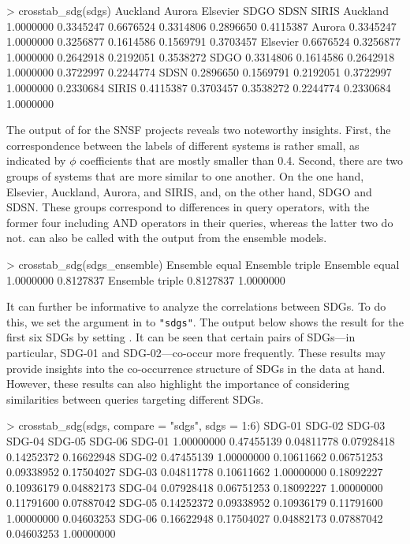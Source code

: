 \begin{example}

> crosstab_sdg(sdgs)
          Auckland    Aurora  Elsevier      SDGO      SDSN     SIRIS
Auckland 1.0000000 0.3345247 0.6676524 0.3314806 0.2896650 0.4115387
Aurora   0.3345247 1.0000000 0.3256877 0.1614586 0.1569791 0.3703457
Elsevier 0.6676524 0.3256877 1.0000000 0.2642918 0.2192051 0.3538272
SDGO     0.3314806 0.1614586 0.2642918 1.0000000 0.3722997 0.2244774
SDSN     0.2896650 0.1569791 0.2192051 0.3722997 1.0000000 0.2330684
SIRIS    0.4115387 0.3703457 0.3538272 0.2244774 0.2330684 1.0000000

\end{example}

The output of  for the SNSF projects reveals two noteworthy insights. First, the correspondence between the labels of different systems is rather small, as indicated by $\phi$ coefficients that are mostly smaller than 0.4. Second, there are two groups of systems that are more similar to one another. On the one hand, Elsevier, Auckland, Aurora, and SIRIS, and, on the other hand, SDGO and SDSN. These groups correspond to differences in query operators, with the former four including AND operators in their queries, whereas the latter two do not.  can also be called with the output from the ensemble models.

\begin{example}
> crosstab_sdg(sdgs_ensemble)
                Ensemble equal Ensemble triple
Ensemble equal       1.0000000       0.8127837
Ensemble triple      0.8127837       1.0000000
\end{example}


It can further be informative to analyze the correlations between SDGs. To do this, we set the  argument in  to \texttt{"sdgs"}. The output below shows the result for the first six SDGs by setting . It can be seen that certain pairs of SDGs---in particular, SDG-01 and SDG-02---co-occur more frequently. These results may provide insights into the co-occurrence structure of SDGs in the data at hand. However, these results can also highlight the importance of considering similarities between queries targeting different SDGs.  

\begin{example}

> crosstab_sdg(sdgs, compare = "sdgs", sdgs = 1:6)
           SDG-01     SDG-02     SDG-03     SDG-04     SDG-05     SDG-06
SDG-01 1.00000000 0.47455139 0.04811778 0.07928418 0.14252372 0.16622948
SDG-02 0.47455139 1.00000000 0.10611662 0.06751253 0.09338952 0.17504027
SDG-03 0.04811778 0.10611662 1.00000000 0.18092227 0.10936179 0.04882173
SDG-04 0.07928418 0.06751253 0.18092227 1.00000000 0.11791600 0.07887042
SDG-05 0.14252372 0.09338952 0.10936179 0.11791600 1.00000000 0.04603253
SDG-06 0.16622948 0.17504027 0.04882173 0.07887042 0.04603253 1.00000000


\end{example}


